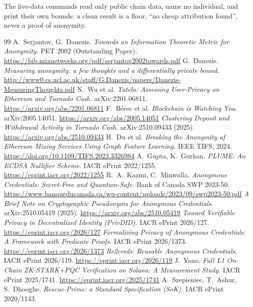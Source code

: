 \documentclass[11pt]{article}
\begin{document}
The live-data commands read only public chain data, name no individual, and print their
own bounds: a clean result is a floor, ``no cheap attribution found'', never a proof of
anonymity.

\begin{thebibliography}{99}
\small
{} A.~Serjantov, G.~Danezis. \emph{Towards an Information
Theoretic Metric for Anonymity.} PET 2002 (Outstanding Paper).
\url{https://bib.mixnetworks.org/pdf/serjantov2002towards.pdf}
 G.~Danezis. \emph{Measuring anonymity: a few thoughts and a
differentially private bound.}
\url{http://www0.cs.ucl.ac.uk/staff/G.Danezis/papers/Danezis-MeasuringThoughts.pdf}
 N.~Wu et al. \emph{Tutela: Assessing User-Privacy on Ethereum and
Tornado Cash.} arXiv:2201.06811. \url{https://arxiv.org/abs/2201.06811}
 F.~B\'eres et al. \emph{Blockchain is Watching You.} arXiv:2005.14051.
\url{https://arxiv.org/abs/2005.14051}
 \emph{Clustering Deposit and Withdrawal Activity in Tornado
Cash.} arXiv:2510.09433 (2025). \url{https://arxiv.org/abs/2510.09433}
 H.~Du et al. \emph{Breaking the Anonymity of Ethereum Mixing Services
Using Graph Feature Learning.} IEEE TIFS, 2024.
\url{https://doi.org/10.1109/TIFS.2023.3326984}
 A.~Gupta, K.~Gurkan. \emph{PLUME: An ECDSA Nullifier Scheme.} IACR
ePrint 2022/1255. \url{https://eprint.iacr.org/2022/1255}
 R.~A.~Kazmi, C.~Minwalla. \emph{Anonymous Credentials: Secret-Free and
Quantum-Safe.} Bank of Canada SWP 2023-50.
\url{https://www.banqueducanada.ca/wp-content/uploads/2023/09/swp2023-50.pdf}
 \emph{A Brief Note on Cryptographic Pseudonyms for Anonymous
Credentials.} arXiv:2510.05419 (2025). \url{https://arxiv.org/abs/2510.05419}
 \emph{Toward Verifiable Privacy in Decentralized Identity
(PrivDID).} IACR ePrint 2026/127. \url{https://eprint.iacr.org/2026/127}
 \emph{Formalizing Privacy of Anonymous Credentials: A Framework
with Predicate Proofs.} IACR ePrint 2026/1373. \url{https://eprint.iacr.org/2026/1373}
 \emph{Re2creds: Reusable Anonymous Credentials.} IACR ePrint
2026/119. \url{https://eprint.iacr.org/2026/119}
 J.~Yano. \emph{Full L1 On-Chain ZK-STARK+PQC Verification on
Solana: A Measurement Study.} IACR ePrint 2025/1741.
\url{https://eprint.iacr.org/2025/1741}
 A.~Szepieniec, T.~Ashur, S.~Dhooghe. \emph{Rescue-Prime: a
Standard Specification (SoK).} IACR ePrint 2020/1143.

\end{thebibliography}
\end{document}

